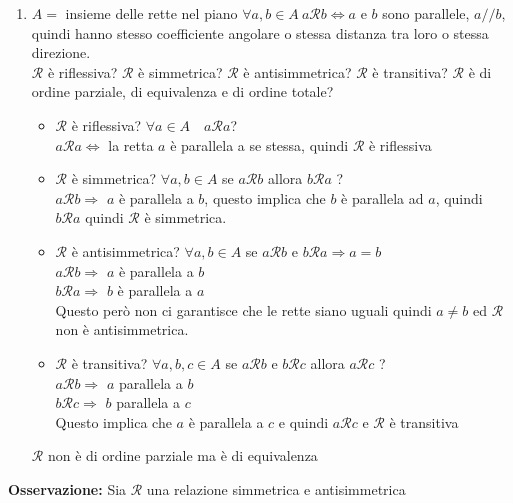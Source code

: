 \documentclass[12pt, letterpaper]{report}
\begin{document}
\begin{enumerate}
			\textbf{\color{red} Ogni relazione identità è relazione di equivalenza}
			\item $A = $ insieme delle rette nel piano $\forall  a,b \in A\ a \mathscr{R} b \iff a$ e $b$ sono parallele, $a // b$, quindi hanno stesso coefficiente angolare o stessa distanza tra loro o stessa direzione. \\
			$\mathscr{R}$ è riflessiva? $\mathscr{R}$ è simmetrica? $\mathscr{R}$ è antisimmetrica? $\mathscr{R}$ è transitiva? $\mathscr{R}$ è di ordine parziale, di equivalenza e di ordine totale? \\
			\begin{itemize}
				\item $\mathscr{R}$ è riflessiva? $\forall a \in A \quad a \mathscr{R} a$? \\
				$a \mathscr{R} a \iff$ la retta $a$ è parallela a se stessa, quindi $\mathscr{R}$ è riflessiva
				\item $\mathscr{R}$ è simmetrica? $\forall a,b \in A$ se $a \mathscr{R} b$ allora $b \mathscr{R} a$ ? \\
				$a \mathscr{R} b \Rightarrow$ $a$ è parallela a $b$, questo implica che $b$ è parallela ad $a$, quindi $b \mathscr{R} a$ quindi $\mathscr{R}$ è simmetrica.
				\item $\mathscr{R}$ è antisimmetrica? $\forall a,b \in A$ se $a \mathscr{R} b$ e $b \mathscr{R} a \Rightarrow a = b$ \\
				$a \mathscr{R} b \Rightarrow$ $a$ è parallela a $b$ \\
				$b \mathscr{R} a \Rightarrow$ $b$ è parallela a $a$ \\
				Questo però non ci garantisce che le rette siano uguali quindi $a \neq b$ ed $\mathscr{R}$ non è antisimmetrica.
				\item $\mathscr{R}$ è transitiva? $\forall a,b,c \in A$ se $a \mathscr{R} b$ e $b \mathscr{R} c$ allora $a \mathscr{R} c$ ? \\
				$a \mathscr{R} b \Rightarrow$ $a$ parallela a $b$\\
				$b \mathscr{R} c \Rightarrow$ $b$ parallela a $c$\\
				Questo implica che $a$ è parallela a $c$ e quindi $a \mathscr{R} c$ e $\mathscr{R}$ è transitiva
			\end{itemize}
			$\mathscr{R}$ non è di ordine parziale ma è di equivalenza
		\end{enumerate}
		\textbf{Osservazione:} Sia $\mathscr{R}$ una relazione simmetrica e antisimmetrica \\
\end{document}

